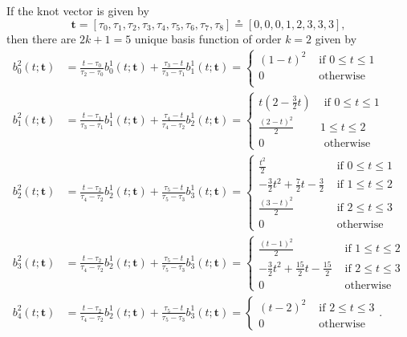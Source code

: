 \documentclass{article}
\newcommand{\defeq}{\circeq}
\begin{document}
If the knot vector is given by
\[
\mathbf{t} = [\tau_0, \tau_1, \tau_2, \tau_3, \tau_4, \tau_5, \tau_6, \tau_7, \tau_8] \defeq [0, 0, 0, 1, 2, 3, 3, 3],
\]
then there are $2k+1=5$ unique basis function of order $k=2$ given by
\begin{align*}
b_0^2(t; \mathbf{t}) &= \frac{t-\tau_0}{\tau_2-\tau_0} b_0^1(t;\mathbf{t}) + \frac{\tau_3-t}{\tau_3-\tau_1}b_1^1(t; \mathbf{t}) 
	= \begin{cases} (1-t)^2   & \text{~if~} 0 \leq t \leq 1 \\
				    0 & \text{~otherwise~}  \\ 
 	  \end{cases}
\\ 
b_1^2(t; \mathbf{t}) &= \frac{t-\tau_1}{\tau_3-\tau_1} b_1^1(t;\mathbf{t}) + \frac{\tau_4-t}{\tau_4-\tau_2}b_2^1(t; \mathbf{t})
	= \begin{cases} t(2-\frac{3}{2}t) & \text{~if~} 0 \leq t \leq 1 \\ 
 									\frac{(2-t)^2}{2} & 1 \leq t \leq 2 \\
 									0 & \text{~otherwise}
 					    \end{cases}
\\ 
b_2^2(t; \mathbf{t}) &= \frac{t-\tau_2}{\tau_4-\tau_2} b_2^1(t;\mathbf{t}) + \frac{\tau_5-t}{\tau_5-\tau_3}b_3^1(t; \mathbf{t})
	= \begin{cases} \frac{t^2}{2} & \text{~if~} 0 \leq t \leq 1 \\ 
 					-\frac{3}{2}t^2 + \frac{7}{2}t - \frac{3}{2} & \text{~if~} 1 \leq t \leq 2 \\
 					\frac{(3-t)^2}{2} & \text{~if~} 2 \leq t \leq 3 \\
 					0 & \text{~otherwise}
 	  \end{cases}
\\ 
b_3^2(t; \mathbf{t}) &= \frac{t-\tau_2}{\tau_4-\tau_2} b_2^1(t;\mathbf{t}) + \frac{\tau_5-t}{\tau_5-\tau_3}b_3^1(t; \mathbf{t})
	= \begin{cases} \frac{(t-1)^2}{2} & \text{~if~} 1 \leq t \leq 2 \\ 
 					-\frac{3}{2}t^2 + \frac{15}{2}t-\frac{15}{2} & \text{~if~} 2 \leq t \leq 3 \\
 					0 & \text{~otherwise}
 	  \end{cases}
\\ 
b_4^2(t; \mathbf{t}) &= \frac{t-\tau_2}{\tau_4-\tau_2} b_2^1(t;\mathbf{t}) + \frac{\tau_5-t}{\tau_5-\tau_3}b_3^1(t; \mathbf{t})
	= \begin{cases} (t-2)^2 & \text{~if~} 2 \leq t \leq 3 \\ 
 					0 & \text{~otherwise}
 	  \end{cases}.	   	  
\end{align*}
\end{document}
